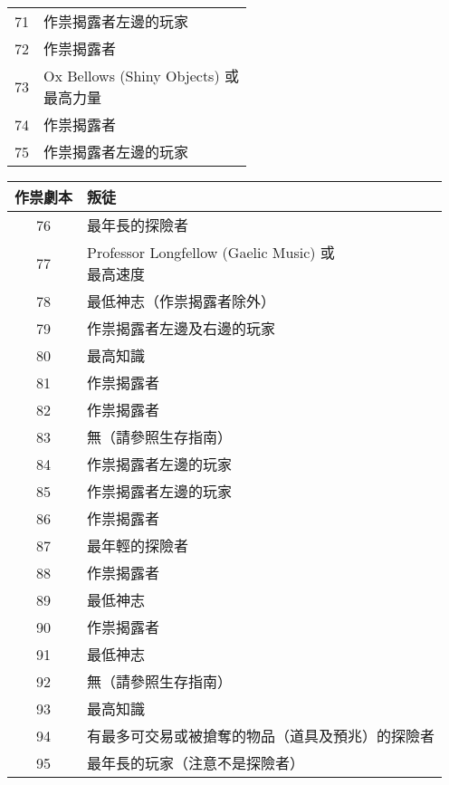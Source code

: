 \begin{center}
\begin{minipage}[t]{.45\textwidth}
\begin{tabular}[t]{ c l }
        71 & 作祟揭露者左邊的玩家 \\
        72 & 作祟揭露者 \\
        73 & \makecell[tl]{Ox Bellows (Shiny Objects) 或 \\ 最高力量 } \\
        74 & 作祟揭露者 \\
        75 & 作祟揭露者左邊的玩家 \\
    \end{tabular}
  \end{minipage}\hfil
  \begin{minipage}[t]{.45\textwidth}
    \renewcommand{\arraystretch}{1.5}
    \begin{tabular}[t]{ c l }
      \toprule
        \bfseries 作祟劇本 & \bfseries 叛徒 \\[.5ex]
      \midrule
        76 & 最年長的探險者 \\
        77 & \makecell[tl]{Professor Longfellow (Gaelic Music) 或 \\ 最高速度 } \\
        78 & 最低神志（作祟揭露者除外） \\
        79 & 作祟揭露者左邊及右邊的玩家 \\
        80 & 最高知識 \\

        81 & 作祟揭露者 \\
        82 & 作祟揭露者 \\
        83 & 無（請參照生存指南）\\
        84 & 作祟揭露者左邊的玩家 \\
        85 & 作祟揭露者左邊的玩家 \\

        86 & 作祟揭露者 \\
        87 & 最年輕的探險者 \\
        88 & 作祟揭露者 \\
        89 & 最低神志 \\
        90 & 作祟揭露者 \\

        91 & 最低神志 \\
        92 & 無（請參照生存指南）\\
        93 & 最高知識 \\
        94 & \begin{minipage}[t]{15em}有最多可交易或被搶奪的物品（道具及預兆）的探險者\end{minipage} \\
        95 & 最年長的玩家（注意不是探險者） \\


\end{tabular}
\end{minipage}
\end{center}
